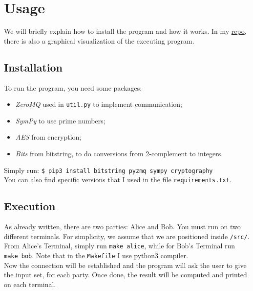 \documentclass[12pt]{article}
\newcommand{\inlinecode}{\texttt}
\begin{document}
\section{Usage}
We will briefly explain how to install the program and how it works. In my \hyperref[zanoGit]{repo}, there is also a graphical visualization of the executing program. 
\subsection{Installation}
To run the program, you need some packages:
\begin{itemize}
    \item \textit{ZeroMQ} used in \inlinecode{util.py} to implement communication;
    \item \textit{SymPy} to use prime numbers;
    \item \textit{AES} from encryption;
    \item \textit{Bits} from bitstring, to do conversions from 2-complement to integers.
\end{itemize}
Simply run: 
\inlinecode{\$ pip3 install bitstring pyzmq sympy cryptography}\\
You can also find specific versions that I used in the file \inlinecode{requirements.txt}.
\subsection{Execution}
As already written, there are two parties: Alice and Bob. You must run on two different terminals. For simplicity, we assume that we are positioned inside \inlinecode{/src/}.
From Alice's Terminal, simply run \inlinecode{make alice}, while for Bob's Terminal run \inlinecode{make bob}. Note that in the \inlinecode{Makefile} I use python3 compiler.\\
Now the connection will be established and the program will ask the user to give the input set, for each party. Once done, the result will be computed and printed on each terminal.
\end{document}

